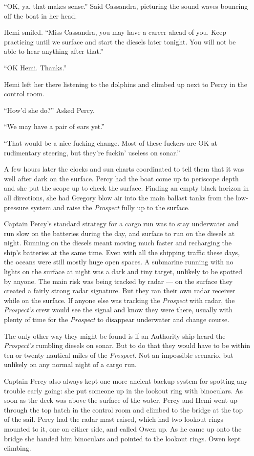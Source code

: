 \documentclass[]{scrbook}
\begin{document}
``OK, ya, that makes sense.'' Said Cassandra, picturing the sound waves
bouncing off the boat in her head.

Hemi smiled. ``Miss Cassandra, you may have a career ahead of you. Keep
practicing until we surface and start the diesels later tonight. You
will not be able to hear anything after that.''

``OK Hemi. Thanks.''

Hemi left her there listening to the dolphins and climbed up next to
Percy in the control room.

``How'd she do?'' Asked Percy.

``We may have a pair of ears yet.''

``That would be a nice fucking change. Most of these fuckers are OK at
rudimentary steering, but they're fuckin' useless on sonar.''

A few hours later the clocks and sun charts coordinated to tell them
that it was well after dark on the surface. Percy had the boat come up
to periscope depth and she put the scope up to check the surface.
Finding an empty black horizon in all directions, she had Gregory blow
air into the main ballast tanks from the low-pressure system and raise
the \emph{Prospect} fully up to the surface.

Captain Percy's standard strategy for a cargo run was to stay underwater
and run slow on the batteries during the day, and surface to run on the
diesels at night. Running on the diesels meant moving much faster and
recharging the ship's batteries at the same time. Even with all the
shipping traffic these days, the oceans were still mostly huge open
spaces. A submarine running with no lights on the surface at night was a
dark and tiny target, unlikely to be spotted by anyone. The main risk
was being tracked by radar --- on the surface they created a fairly
strong radar signature. But they ran their own radar receiver while on
the surface. If anyone else was tracking the \emph{Prospect} with radar,
the \emph{Prospect's} crew would see the signal and know they were
there, usually with plenty of time for the \emph{Prospect} to disappear
underwater and change course.

The only other way they might be found is if an Authority ship heard the
\emph{Prospect's} rumbling diesels on sonar. But to do that they would
have to be within ten or twenty nautical miles of the \emph{Prospect}.
Not an impossible scenario, but unlikely on any normal night of a cargo
run.

Captain Percy also always kept one more ancient backup system for
spotting any trouble early going: she put someone up in the lookout ring
with binoculars. As soon as the deck was above the surface of the water,
Percy and Hemi went up through the top hatch in the control room and
climbed to the bridge at the top of the sail. Percy had the radar mast
raised, which had two lookout rings mounted to it, one on either side,
and called Owen up. As he came up onto the bridge she handed him
binoculars and pointed to the lookout rings. Owen kept climbing.
\end{document}
